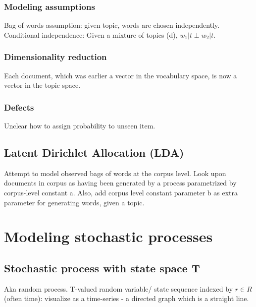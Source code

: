\documentclass[oneside, article]{memoir}
\begin{document}
\subsection{Modeling assumptions}
Bag of words assumption: given topic, words are chosen independently. Conditional independence: Given a mixture of topics (d), $w_1|t \perp w_2|t$.

\subsection{Dimensionality reduction}
Each document, which was earlier a vector in the vocabulary space, is now a vector in the topic space.

\subsection{Defects}
Unclear how to assign probability to unseen item.

\section{Latent Dirichlet Allocation (LDA)}
Attempt to model observed bags of words at the corpus level. Look upon documents in corpus as having been generated by a process parametrized by corpus-level constant a. Also, add corpus level constant parameter b as extra parameter for generating words, given a topic.

\begin{figure}[!htb]
\end{figure}


\chapter{Modeling stochastic processes}
\section{Stochastic process with state space T}
Aka random process. T-valued random variable/ state sequence indexed by $r\in R$ (often time): visualize as a time-series - a directed graph which is a straight line.
\end{document}
